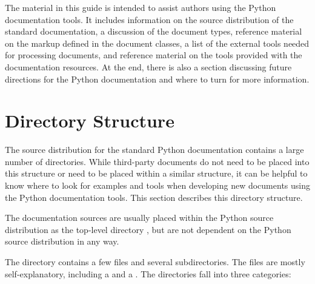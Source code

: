 \documentclass{howto}
\begin{document}
  The material in this guide is intended to assist authors using the
  Python documentation tools.  It includes information on the source
  distribution of the standard documentation, a discussion of the
  document types, reference material on the markup defined in the
  document classes, a list of the external tools needed for processing
  documents, and reference material on the tools provided with the
  documentation resources.  At the end, there is also a section
  discussing future directions for the Python documentation and where
  to turn for more information.

\section{Directory Structure}

  The source distribution for the standard Python documentation
  contains a large number of directories.  While third-party documents
  do not need to be placed into this structure or need to be placed
  within a similar structure, it can be helpful to know where to look
  for examples and tools when developing new documents using the
  Python documentation tools.  This section describes this directory
  structure.

  The documentation sources are usually placed within the Python
  source distribution as the top-level directory , but
  are not dependent on the Python source distribution in any way.

  The  directory contains a few files and several
  subdirectories.  The files are mostly self-explanatory, including a
   and a .  The directories fall into
  three categories:
\end{document}
